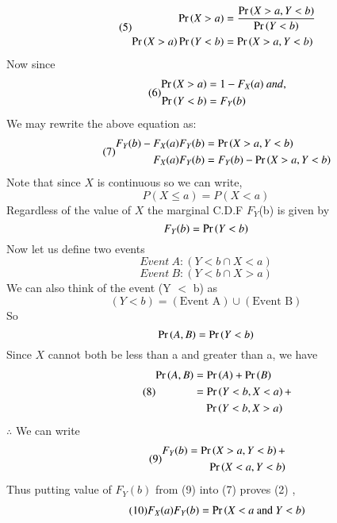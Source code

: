 \documentclass[journal,12pt,twocolumn]{IEEEtran}
\begin{document}
\begin{enumerate}
\begin{align}\tag{5}
    \begin{split}
        \Pr\left(X > a\right) &= \frac{\Pr\left(X > a, Y < b\right)}{\Pr\left(Y < b\right)}\\
        \Pr\left(X > a\right)\Pr\left(Y < b\right) &= \Pr\left(X > a, Y < b\right)
    \end{split}
\end{align}
Now since 
\begin{align}\tag{6}
    \begin{split}
        \Pr\left(X > a\right) &= 1 - F_X(a)\ and,\\
        \Pr\left(Y < b\right) &= F_Y(b)
    \end{split}
\end{align}
We may rewrite the above equation as:
\begin{align}\tag{7}
    \begin{split}
        F_Y(b) - F_X(a)F_Y(b) &= \Pr\left(X > a, Y < b\right)\\
        F_X(a)F_Y(b) &= F_Y(b) - \Pr\left(X > a, Y < b\right)
    \end{split}
\end{align}
Note that since $X$ is continuous so we can write, $$P(X \leq a) = P(X < a)$$
Regardless of the value of $X$ the marginal C.D.F $F_Y$(b) is given by
$$F_Y(b) = \Pr\left(Y < b\right)$$
Now let us define two events $$Event\ A: (Y < b \cap X < a)$$ $$Event\ B: (Y < b \cap X > a)$$
We can also think of the event (Y $\mathop{<}$ b) as $$ (Y < b) = (\text{Event A}) \cup (\text{Event B})$$
So $$\Pr\left(A, B\right) = \Pr\left(Y < b\right)$$ Since $X$ cannot both be less than a and greater than a, we have 
\begin{align}\tag{8}
    \begin{split}
        \Pr\left(A, B\right) &= \Pr\left(A\right) + \Pr\left(B\right)\\
                  &= \Pr\left(Y < b, X < a\right) +\\
                  &\ \ \ \ \Pr\left(Y < b, X > a\right)
    \end{split}
\end{align}
$\therefore$ We can write
\begin{align}\tag{9}
    \begin{split}
        F_Y(b) = \Pr\left(X > a, Y < b\right) +\\
                 \Pr\left(X < a, Y < b\right)
    \end{split}
\end{align}
Thus putting value of $F_Y(b)$ from (9) into (7) proves (2) ,
\begin{align}\tag{10}
    \begin{split}
        F_X(a)F_Y(b) &= \pr{X < a \mbox{ and } Y < b}\\

\end{split}
\end{align}
\end{enumerate}
\end{document}
